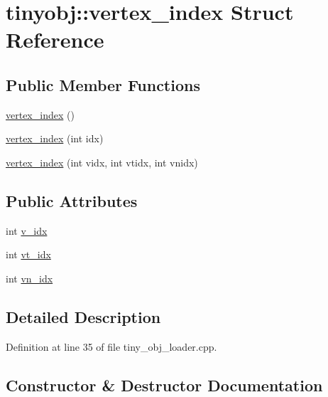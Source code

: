 \hypertarget{structtinyobj_1_1vertex__index}{}\section{tinyobj\+:\+:vertex\+\_\+index Struct Reference}
\label{structtinyobj_1_1vertex__index}
\subsection*{Public Member Functions}
\begin{DoxyCompactItemize}
\item 
\hyperlink{structtinyobj_1_1vertex__index_a44cc515c3c58d087edc620bc90d0bea8}{vertex\+\_\+index} ()
\item 
\hyperlink{structtinyobj_1_1vertex__index_a894075fa64d32082219c138f111e4753}{vertex\+\_\+index} (int idx)
\item 
\hyperlink{structtinyobj_1_1vertex__index_aa3c4d6bcba36c2abb06e25497a1376a1}{vertex\+\_\+index} (int vidx, int vtidx, int vnidx)
\end{DoxyCompactItemize}
\subsection*{Public Attributes}
\begin{DoxyCompactItemize}
\item 
int \hyperlink{structtinyobj_1_1vertex__index_a91a2616fb97e0da915a40654edf9b558}{v\+\_\+idx}
\item 
int \hyperlink{structtinyobj_1_1vertex__index_aae7e058d3aa0993aa05e95d82dd6b8bf}{vt\+\_\+idx}
\item 
int \hyperlink{structtinyobj_1_1vertex__index_a30f2a63a5ed20cc3ad64e340c4020da8}{vn\+\_\+idx}
\end{DoxyCompactItemize}


\subsection{Detailed Description}


Definition at line 35 of file tiny\+\_\+obj\+\_\+loader.\+cpp.



\subsection{Constructor \& Destructor Documentation}
\mbox{\label{structtinyobj_1_1vertex__index_a44cc515c3c58d087edc620bc90d0bea8}} 
